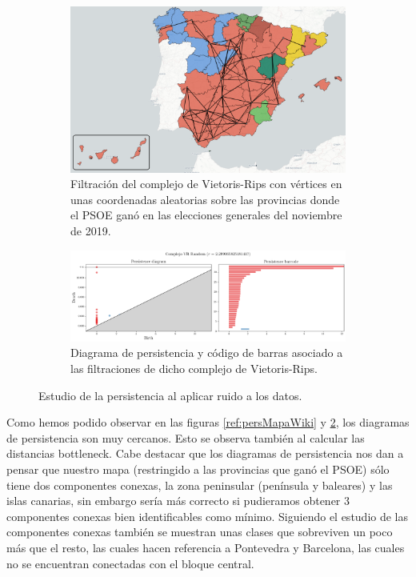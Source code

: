 \begin{figure}[!ht]
\centering
\begin{subfigure}[b]{\textwidth}
	\centering
	\includegraphics[width=\textwidth]{include/figuras/mapaRandom.png} 
	\caption{Filtración del complejo de Vietoris-Rips con vértices en unas coordenadas aleatorias sobre las provincias donde el PSOE ganó en las elecciones generales del noviembre de 2019.}
	\label{ref:mapaRandom}
\end{subfigure}
\begin{subfigure}[b]{\textwidth}
	\centering
	\includegraphics[width=\textwidth]{../code/output/ejemploMapa2.png} 
	\caption{Diagrama de persistencia y código de barras asociado a las filtraciones de dicho complejo de Vietoris-Rips.}
	\label{ref:persMapaRandom}
\end{subfigure}
\caption{Estudio de la persistencia al aplicar ruido a los datos.}
\label{ref:figMapaRandom}
\end{figure}

Como hemos podido observar en las figuras \ref{ref:persMapaWiki} y \ref{ref:persMapaRandom}, los diagramas de persistencia son muy cercanos. Esto se observa también al calcular las distancias bottleneck. Cabe destacar que los diagramas de persistencia nos dan a pensar que nuestro mapa (restringido a las provincias que ganó el PSOE) sólo tiene dos componentes conexas, la zona peninsular (península y baleares) y las islas canarias, sin embargo sería más correcto si pudieramos obtener 3 componentes conexas  bien identificables como mínimo. Siguiendo el estudio de las componentes conexas también se muestran unas clases que sobreviven un poco más que el resto, las cuales hacen referencia a Pontevedra y Barcelona, las cuales no se encuentran conectadas con el bloque central.

